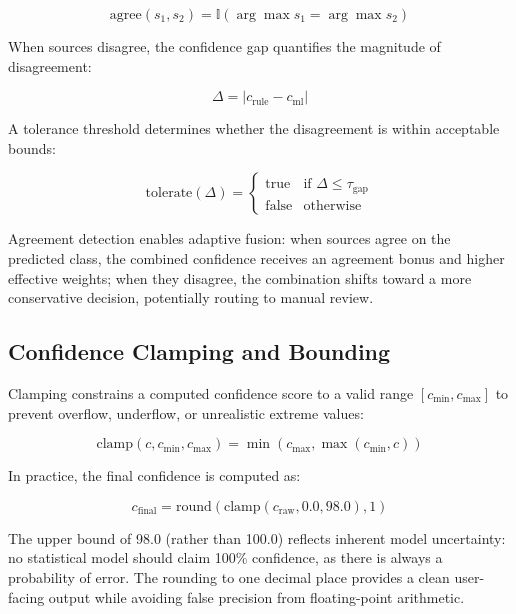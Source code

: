 \documentclass[10pt,a4paper]{article}
\begin{document}
\begin{equation}
\text{agree}(s_1, s_2) = \mathbb{I}\left(\arg\max s_1 = \arg\max s_2\right)
\label{eq:agreement}
\end{equation}

When sources disagree, the confidence gap quantifies the magnitude of disagreement:

\begin{equation}
\Delta = |c_{\text{rule}} - c_{\text{ml}}|
\label{eq:confidence-gap}
\end{equation}

A tolerance threshold determines whether the disagreement is within acceptable bounds:

\begin{equation}
\text{tolerate}(\Delta) = \begin{cases} \text{true} & \text{if } \Delta \leq \tau_{\text{gap}} \\ \text{false} & \text{otherwise} \end{cases}
\label{eq:disagreement-tolerance}
\end{equation}

Agreement detection enables adaptive fusion: when sources agree on the predicted class, the combined confidence receives an agreement bonus and higher effective weights; when they disagree, the combination shifts toward a more conservative decision, potentially routing to manual review.

\subsection{Confidence Clamping and Bounding}
\label{sec:confidence-clamping}

Clamping constrains a computed confidence score to a valid range $[c_{\min}, c_{\max}]$ to prevent overflow, underflow, or unrealistic extreme values:

\begin{equation}
\text{clamp}(c, c_{\min}, c_{\max}) = \min(c_{\max}, \max(c_{\min}, c))
\label{eq:clamp}
\end{equation}

In practice, the final confidence is computed as:

\begin{equation}
c_{\text{final}} = \text{round}(\text{clamp}(c_{\text{raw}}, 0.0, 98.0), 1)
\label{eq:final-confidence}
\end{equation}

The upper bound of 98.0 (rather than 100.0) reflects inherent model uncertainty: no statistical model should claim 100\% confidence, as there is always a probability of error. The rounding to one decimal place provides a clean user-facing output while avoiding false precision from floating-point arithmetic.
\end{document}
